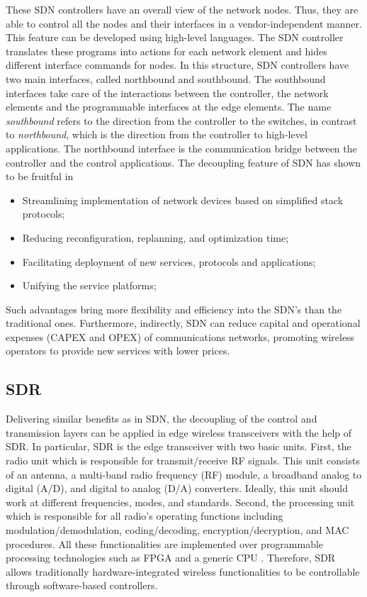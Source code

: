 \documentclass[conference]{IEEEtran}
\begin{document}
These SDN controllers have an overall view of the network nodes. Thus, they are able to control all the nodes and their interfaces in a vendor-independent manner. This feature can be developed using high-level languages. The SDN controller translates these programs into actions for each network element and hides different interface commands for nodes. In this structure, SDN controllers have two main interfaces, called northbound and southbound. The southbound interfaces take care of the interactions between the controller, the network elements and the programmable interfaces at the edge elements. The name \textit{southbound} refers to the direction from the controller to the switches, in contrast to \textit{northbound}, which is the direction from the controller to high-level applications. The northbound interface is the
communication bridge between the controller and the control applications. The decoupling feature of SDN has shown to be fruitful in 
\begin{itemize}
	\item Streamlining implementation of network devices based on simplified stack protocols;
	\item Reducing reconfiguration, replanning, and optimization time;
	\item Facilitating deployment of new services, protocols and applications;
	\item Unifying the service platforms;
\end{itemize}

Such advantages bring more flexibility and efficiency into the SDN's than the traditional ones. Furthermore, indirectly, SDN can reduce capital and operational expenses (CAPEX and OPEX) of communications networks, promoting wireless operators to provide new services with lower prices. 

\subsection{SDR}
Delivering similar benefits as in SDN, the decoupling of the control and transmission layers can be applied in edge wireless transceivers with the help of SDR. In particular, SDR is the edge transceiver with two basic units. First, the radio unit which is responsible for transmit/receive RF signals. This unit consists of an antenna, a multi-band radio frequency (RF) module, a broadband analog to digital (A/D), and digital to analog (D/A) converters. Ideally, this unit should work at different frequencies, modes, and standards. Second, the processing unit which is responsible for all radio's operating functions including modulation/demodulation, coding/decoding, encryption/decryption, and MAC procedures. All these functionalities are implemented over programmable processing technologies such as FPGA and a generic CPU \cite{7113226}. Therefore, SDR allows traditionally hardware-integrated wireless functionalities to be controllable through software-based controllers. 
 	
\end{document}
